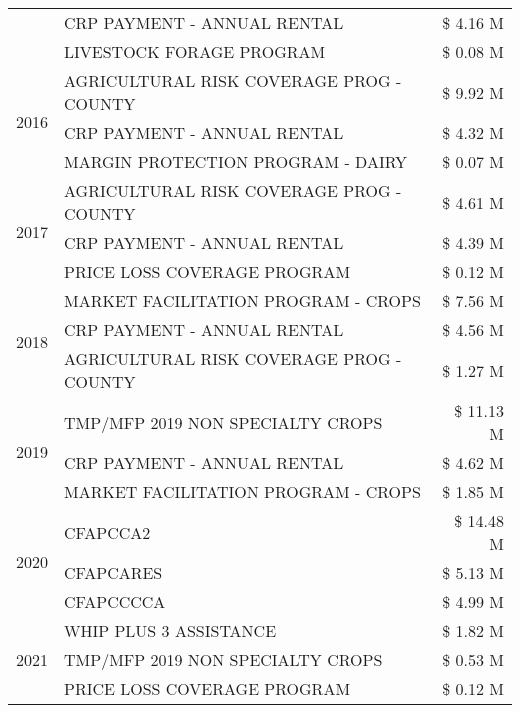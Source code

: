 \begin{tabular}{llr}
 & CRP PAYMENT - ANNUAL RENTAL & \$ 4.16 M \\
 & LIVESTOCK FORAGE PROGRAM & \$ 0.08 M \\
\cline{1-3}
\multirow[t]{3}{*}{2016} & AGRICULTURAL RISK COVERAGE PROG - COUNTY & \$ 9.92 M \\
 & CRP PAYMENT - ANNUAL RENTAL & \$ 4.32 M \\
 & MARGIN PROTECTION PROGRAM - DAIRY & \$ 0.07 M \\
\cline{1-3}
\multirow[t]{3}{*}{2017} & AGRICULTURAL RISK COVERAGE PROG - COUNTY & \$ 4.61 M \\
 & CRP PAYMENT - ANNUAL RENTAL & \$ 4.39 M \\
 & PRICE LOSS COVERAGE PROGRAM & \$ 0.12 M \\
\cline{1-3}
\multirow[t]{3}{*}{2018} & MARKET FACILITATION PROGRAM - CROPS & \$ 7.56 M \\
 & CRP PAYMENT - ANNUAL RENTAL & \$ 4.56 M \\
 & AGRICULTURAL RISK COVERAGE PROG - COUNTY & \$ 1.27 M \\
\cline{1-3}
\multirow[t]{3}{*}{2019} & TMP/MFP 2019 NON SPECIALTY CROPS & \$ 11.13 M \\
 & CRP PAYMENT - ANNUAL RENTAL & \$ 4.62 M \\
 & MARKET FACILITATION PROGRAM - CROPS & \$ 1.85 M \\
\cline{1-3}
\multirow[t]{3}{*}{2020} & CFAPCCA2 & \$ 14.48 M \\
 & CFAPCARES & \$ 5.13 M \\
 & CFAPCCCCA & \$ 4.99 M \\
\cline{1-3}
\multirow[t]{3}{*}{2021} & WHIP PLUS 3 ASSISTANCE & \$ 1.82 M \\
 & TMP/MFP 2019 NON SPECIALTY CROPS & \$ 0.53 M \\
 & PRICE LOSS COVERAGE PROGRAM & \$ 0.12 M \\
\cline{1-3}
\bottomrule
\end{tabular}
